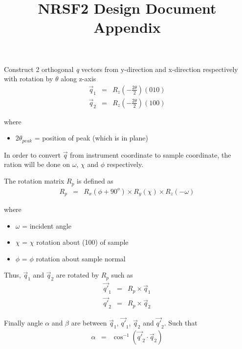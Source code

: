 \documentclass[12pt,bezier,amstex]{report}  %
\title{NRSF2 Design Document Appendix}
\begin{document}
\maketitle

Construct 2 orthogonal {\it q} vectors from y-direction and x-direction respectively with rotation by $\theta$ along z-axis
\begin{eqnarray*}
\vec{q}_1 &=& 
	R_z (- \frac{2\theta}{2}) (010)  \\
\vec{q}_2 &=&
	R_z(-\frac{2\theta}{2}) (100)
\end{eqnarray*}

where 
\begin{itemize}
\item	$2\theta_{peak}$ = position of peak (which is in plane)
\end{itemize}

In order to convert $\vec{q}$ from instrument coordinate to sample coordinate, the ration will be done on
$\omega$, $\chi$ and $\phi$ respectively. 

The rotation matrix $R_p$ is defined as
\begin{eqnarray*}
R_p &=& R_x(\phi + 90^o) \times R_y(\chi) \times R_z(-\omega)
\end{eqnarray*}

where 
\begin{itemize}
\item	$\omega$ = incident angle
\item	$\chi$ = $\chi$ rotation about (100) of sample
\item	$\phi$ =  $\phi$ rotation about sample normal
\end{itemize}

Thus, $\vec{q}_1$ and $\vec{q}_2$ are rotated by $R_p$ such as
\begin{eqnarray*}
\vec{q\prime}_1 &=& R_p\times \vec{q}_1	\\
\vec{q\prime}_2 &=& R_p\times \vec{q}_2
\end{eqnarray*}

Finally angle $\alpha$ and $\beta$ are between $\vec{q}_1$, $\vec{q\prime}_1$, $\vec{q}_2$ and $\vec{q\prime}_2$.
Such that
\begin{eqnarray*}
\alpha &=& \cos^{-1}(\vec{q\prime}_2\cdot\vec{q}_2)
\end{eqnarray*}
\end{document}

